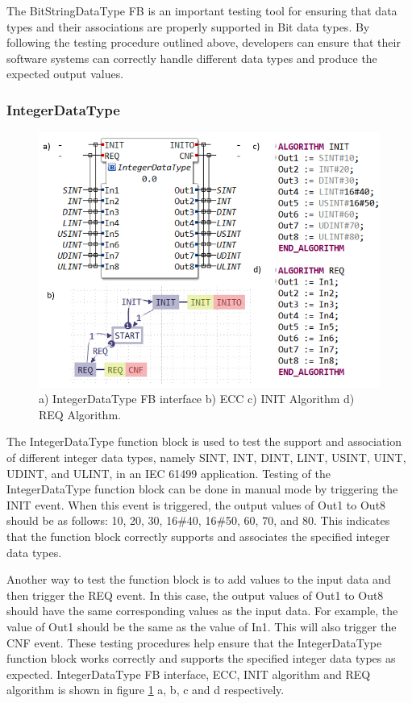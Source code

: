 \documentclass[conference]{IEEEtran}
\begin{document}
The BitStringDataType FB is an important testing tool for ensuring that data types and their associations are properly supported in Bit data types. By following the testing procedure outlined above, developers can ensure that their software systems can correctly handle different data types and produce the expected output values.
\hfill \break
\subsubsection{IntegerDataType}

\begin{figure}[!b]
    \centering
    \includegraphics[width=\columnwidth]{Figures/IDT.PNG}
    \caption{a) IntegerDataType FB interface b) ECC c) INIT Algorithm d) REQ Algorithm.} 
    \label{fig:IDT}
\end{figure}

The IntegerDataType function block is used to test the support and association of different integer data types, namely SINT, INT, DINT, LINT, USINT, UINT, UDINT, and ULINT, in an IEC 61499 application. Testing of the IntegerDataType function block can be done in manual mode by triggering the INIT event. When this event is triggered, the output values of Out1 to Out8 should be as follows: 10, 20, 30, 16\#40, 16\#50, 60, 70, and 80. This indicates that the function block correctly supports and associates the specified integer data types.

Another way to test the function block is to add values to the input data and then trigger the REQ event. In this case, the output values of Out1 to Out8 should have the same corresponding values as the input data. For example, the value of Out1 should be the same as the value of In1. This will also trigger the CNF event. These testing procedures help ensure that the IntegerDataType function block works correctly and supports the specified integer data types as expected. IntegerDataType FB interface, ECC, INIT algorithm and REQ algorithm  is shown in figure \ref{fig:IDT} a, b, c and d respectively.
\hfill \break
\end{document}
